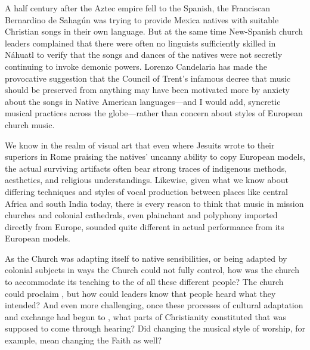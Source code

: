 A half century after the Aztec empire fell to the Spanish, the Franciscan 
Bernardino de Sahagún was trying to provide Mexica natives with suitable 
Christian songs in their own language.%
    \Autocite{Candelaria:Psalmodia}
But at the same time New-Spanish church leaders complained that there were 
often no linguists sufficiently skilled in Náhuatl to verify that the songs and 
dances of the natives were not secretly continuing to invoke demonic powers.%
    \Autocite[637]{Candelaria:Psalmodia}
Lorenzo Candelaria has made the provocative suggestion that the Council of 
Trent's infamous decree that music should be preserved from anything 
 may have been motivated more by anxiety about 
the songs in Native American languages---and I would add, syncretic musical 
practices across the globe---rather than concern about styles of European 
church music.%
    \Autocite[637--638]{Candelaria:Psalmodia} %

We know in the realm of visual art that even where Jesuits wrote to their 
superiors in Rome praising the natives' uncanny ability to copy European 
models, the actual surviving artifacts often bear strong traces of indigenous 
methods, aesthetics, and religious understandings.%
    \Autocites[27--29, 34]{Bailey:Art}
Likewise, given what we know about differing techniques and styles of vocal 
production between places like central Africa and south India today, there is 
every reason to think that music in mission churches and colonial cathedrals, 
even plainchant and polyphony imported directly from Europe, sounded quite 
different in actual performance from its European models.

As the Church was adapting itself to native sensibilities, or being adapted by 
colonial subjects in ways the Church could not fully control, how was the 
church to accommodate its teaching to the  of 
all these different people?
The church could proclaim , but how could leaders know that 
people heard what they intended?
And even more challenging, once these processes of cultural adaptation and 
exchange had begun to , what parts of Christianity constituted 
 that was supposed to come through hearing?
Did changing the musical style of worship, for example, mean changing the Faith 
as well?

